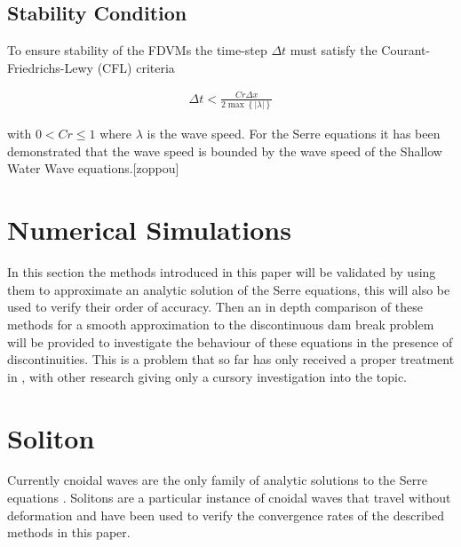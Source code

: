 \documentclass[SingleSpace,12pt,Journal]{Serre_ASCE}
\begin{document}
\subsection{Stability Condition} 
To ensure stability of the FDVMs the time-step $\Delta t$ must satisfy the Courant-Friedrichs-Lewy (CFL) criteria \cite{Harten-etal-1983-357}

\begin{gather}
\label{eq:CFL}
\Delta t < \frac{Cr \Delta x}{2\max \left\lbrace |\lambda| \right\rbrace}
\end{gather}

 with $0<Cr\le 1$ where $\lambda$ is the wave speed. For the Serre equations it has been demonstrated that the wave speed is bounded by the wave speed of the Shallow Water Wave equations.[zoppou]

\section{Numerical Simulations}
\label{section:Numerical Simulations}
In this section the methods introduced in this paper will be validated by using them to approximate an analytic solution of the Serre equations, this will also be used to verify their order of accuracy. Then an in depth comparison of these methods for a smooth approximation to the discontinuous dam break problem will be provided to investigate the behaviour of these equations in the presence of discontinuities. This is a problem that so far has only received a proper treatment in \cite{El-etal-2006}, with other research giving only a cursory investigation into the topic. 

\section{Soliton}
\label{section:Convergence Rate}
Currently cnoidal waves are the only family of analytic solutions to the Serre equations \cite{Carter-Cienfuegos-2010-259}. Solitons are a particular instance of cnoidal waves that travel without deformation and have been used to verify the convergence rates of the described methods in this paper. 
\end{document}
